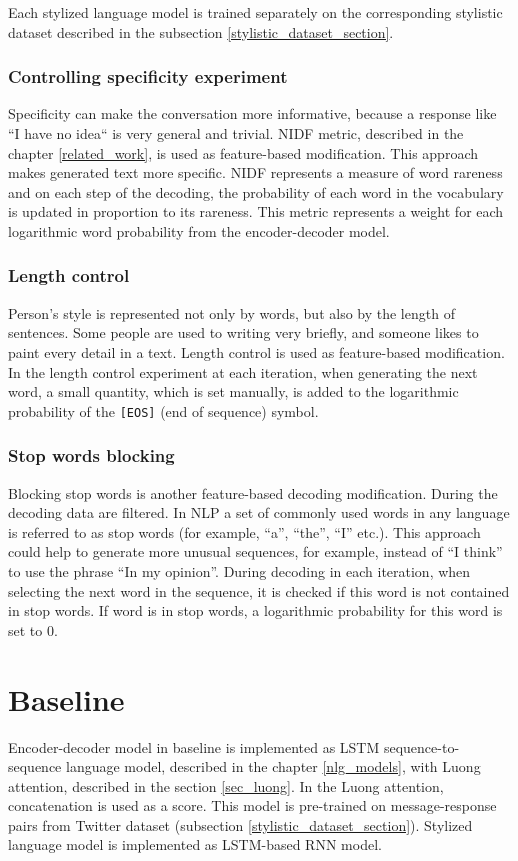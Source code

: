 Each stylized language model is trained separately on the corresponding stylistic dataset described in the subsection \ref{stylistic_dataset_section}.

\subsubsection{Controlling specificity experiment}
Specificity can make the conversation more informative, because a response like ``I have no idea`` is very general and trivial. NIDF metric, described in the chapter \ref{related_work}, is used as feature-based modification. This approach makes generated text more specific. NIDF represents a measure of word rareness and on each step of the decoding, the probability of each word in the vocabulary is updated in proportion to its rareness. This metric represents a weight for each logarithmic word probability from the encoder-decoder model.

\subsubsection{Length control}
Person's style is represented not only by words, but also by the length of sentences. Some people are used to writing very briefly, and someone likes to paint every detail in a text. Length control is used as feature-based modification. In the length control experiment at each iteration, when generating the next word, a small quantity, which is set manually, is added to the logarithmic probability of the \texttt{[EOS]} (end of sequence) symbol. 

\subsubsection{Stop words blocking}
Blocking stop words is another feature-based decoding modification. During the decoding data are filtered. In NLP a set of commonly used words in any language is referred to as stop words (for example, ``a'', ``the'', ``I'' etc.). This approach could help to generate more unusual sequences, for example, instead of ``I think'' to use the phrase ``In my opinion''. During decoding in each iteration, when selecting the next word in the sequence, it is checked if this word is not contained in stop words. If word is in stop words, a logarithmic probability for this word is set to 0. 

\section{Baseline}
Encoder-decoder model in baseline is implemented as LSTM sequence-to-sequence language model, described in the chapter \ref{nlg_models}, with Luong attention, described in the section \ref{sec_luong}. In the Luong attention, concatenation is used as a score. This model is pre-trained on message-response pairs from Twitter dataset (subsection \ref{stylistic_dataset_section}). Stylized language model is implemented as LSTM-based RNN model.

